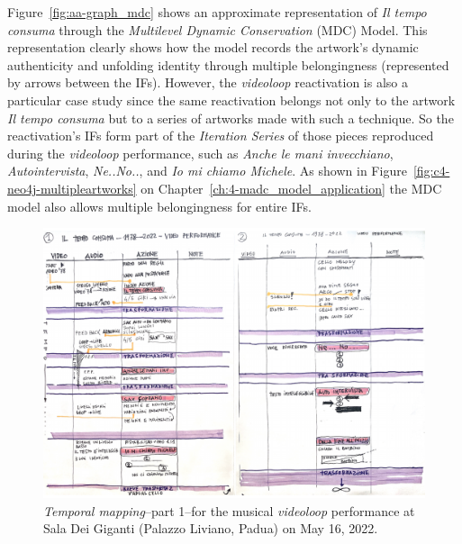Figure~\ref{fig:aa-graph_mdc} shows an approximate representation of \textit{Il tempo consuma} through the \textit{Multilevel Dynamic Conservation} (MDC) Model. This representation clearly shows how the model records the artwork's dynamic authenticity and unfolding identity through multiple belongingness (represented by arrows between the IFs). 
However, the \textit{videoloop} reactivation is also a particular case study since the same reactivation belongs not only to the artwork \textit{Il tempo consuma} but to a series of artworks made with such a technique. So the reactivation’s IFs form part of the \textit{Iteration Series} of those pieces reproduced during the \textit{videoloop} performance, such as \textit{Anche le mani invecchiano}, \textit{Autointervista}, \textit{Ne..No..}, and \textit{Io mi chiamo Michele}. As shown in Figure~\ref{fig:c4-neo4j-multipleartworks} on Chapter~\ref{ch:4-madc_model_application} the MDC model also allows multiple belongingness for entire IFs.



\begin{figure}
    \centering
    \includegraphics[height=\linewidth, angle=90]{chapters/appendix/a/image/figa-data-temporal01a.pdf}
    \caption{\textit{Temporal mapping}–part 1–for the musical \textit{videoloop} performance at Sala Dei Giganti (Palazzo Liviano, Padua) on May 16, 2022.}
    \label{fig:aa-mapping-temporal-01a}
\end{figure}


